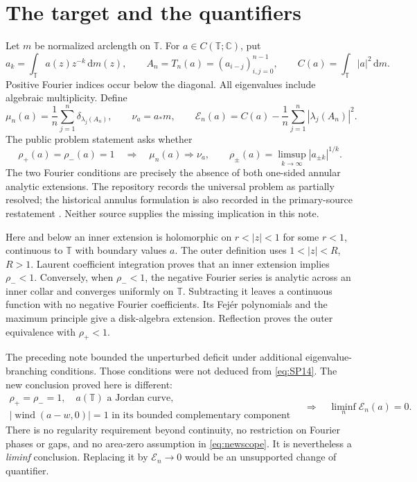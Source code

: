 \documentclass[11pt]{article}
\theoremstyle{definition}
\newcommand{\T}{\mathbb T}
\newcommand{\C}{\mathbb C}
\newcommand{\E}{\mathcal E}
\newcommand{\dd}{\,\mathrm d}
\newcommand{\wind}{\operatorname{wind}}
\begin{document}
\section{The target and the quantifiers}
Let $m$ be normalized arclength on $\T$. For $a\in C(\T;\C)$, put
\begin{equation}
 a_k=\int_\T a(z)z^{-k}\dd m(z),\qquad
 A_n=T_n(a)=(a_{i-j})_{i,j=0}^{n-1},\qquad
 C(a)=\int_\T |a|^2\dd m.
 \label{eq:notation}
\end{equation}
Positive Fourier indices occur below the diagonal. All eigenvalues include algebraic multiplicity. Define
\begin{equation}
 \mu_n(a)=\frac1n\sum_{j=1}^n\delta_{\lambda_j(A_n)},\qquad
 \nu_a=a_*m,\qquad
 \E_n(a)=C(a)-\frac1n\sum_{j=1}^n|\lambda_j(A_n)|^2.
 \label{eq:energy}
\end{equation}
The public problem statement asks whether
\begin{equation}
 \rho_+(a)=\rho_-(a)=1
 \quad\Longrightarrow\quad
 \mu_n(a)\Rightarrow\nu_a,\qquad
 \rho_\pm(a)=\limsup_{k\to\infty}|a_{\pm k}|^{1/k}.
 \label{eq:SP14}
\end{equation}
The two Fourier conditions are precisely the absence of both one-sided annular analytic extensions. The repository records the universal problem as partially resolved; the historical annulus formulation is also recorded in the primary-source restatement \cite{repo,bogoya}. Neither source supplies the missing implication in this note.

Here and below an inner extension is holomorphic on $r<|z|<1$ for some $r<1$, continuous to $\T$ with boundary values $a$. The outer definition uses $1<|z|<R$, $R>1$. Laurent coefficient integration proves that an inner extension implies $\rho_-<1$. Conversely, when $\rho_-<1$, the negative Fourier series is analytic across an inner collar and converges uniformly on $\T$. Subtracting it leaves a continuous function with no negative Fourier coefficients. Its Fej\'er polynomials and the maximum principle give a disk-algebra extension. Reflection proves the outer equivalence with $\rho_+<1$.

The preceding note \cite{round6} bounded the unperturbed deficit under additional eigenvalue-branching conditions. Those conditions were not deduced from \eqref{eq:SP14}. The new conclusion proved here is different:
\begin{equation}
 \begin{gathered}
 \rho_+=\rho_-=1,\quad a(\T)\text{ a Jordan curve},\\
 |\wind(a-w,0)|=1\text{ in its bounded complementary component}
 \end{gathered}
 \quad\Longrightarrow\quad \liminf_n\E_n(a)=0.
 \label{eq:newscope}
\end{equation}
There is no regularity requirement beyond continuity, no restriction on Fourier phases or gaps, and no area-zero assumption in \eqref{eq:newscope}. It is nevertheless a \emph{liminf} conclusion. Replacing it by $\E_n\to0$ would be an unsupported change of quantifier.
\end{document}
